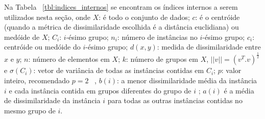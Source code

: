 \begin{center} 
	\begin{table}
		\caption{Principais índices internos de validação disponíveis na literatura}  \label{tbl:indices_internos}
	\end{table}
\end{center}  

Na Tabela ~\ref{tbl:indices_internos} se encontram os índices internos a serem utilizados nesta seção,  onde $X$: é todo o conjunto de dados; $c$: é o centróide (quando a métrica de dissimilaridade escolhida é a distância euclidiana) ou medóide de $X$; $C_i$: $i$-ésimo grupo;  $n_i$: número de instâncias no $i$-ésimo grupo; $c_i$: centróide ou medóide do $i$-ésimo grupo; 
$d(x,y)$: medida de dissimilaridade entre $x$ e $y$; $n$: número de elementos em $X$; $k$: número de grupos em $X$, $||v|| = (v^T.v)^{\frac{1}{2}}$ e $\sigma(C_i)$: vetor de variância de todas as instâncias contidas em $C_i$; 
$p$: valor inteiro, recomendado $p=2$ ~\parencite{I}, $b(i)$: a menor dissimilaridade média da instância $i$ e cada instância contida em grupos diferentes do grupo de $i$ ;  $a(i)$ é a média de dissimilaridade da instância $i$ para todas as outras instâncias contidas no mesmo grupo de $i$.

